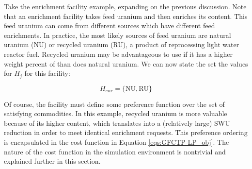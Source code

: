 Take the enrichment facility example, expanding on the previous discussion. Note
that an enrichment facility takes feed uranium and then enriches its 
content. This feed uranium can come from different sources which have different
feed enrichments. In practice, the most likely sources of feed uranium are
natural uranium (NU) or recycled uranium (RU), a product of reprocessing light
water reactor fuel. Recycled uranium may be advantageous to use if it has a
higher weight percent of  than does natural uranium. We can now state the
set the values for $H_{j}$ for this facility:

\begin{equation}\label{eqs:enr-dem-commods}
  H_{enr} = \{ \mbox{NU}, \mbox{RU} \}
\end{equation}

Of course, the facility must define some preference function over the set of
satisfying commodities. In this example, recycled uranium is more valuable
because of its higher  content, which translates into a (relatively large)
SWU reduction in order to meet identical enrichment requests. This preference
ordering is encapsulated in the cost function in Equation
\ref{eqs:GFCTP-LP_obj}. The nature of the cost function in the \Cyclus
simulation environment is nontrivial and explained further in this section.
